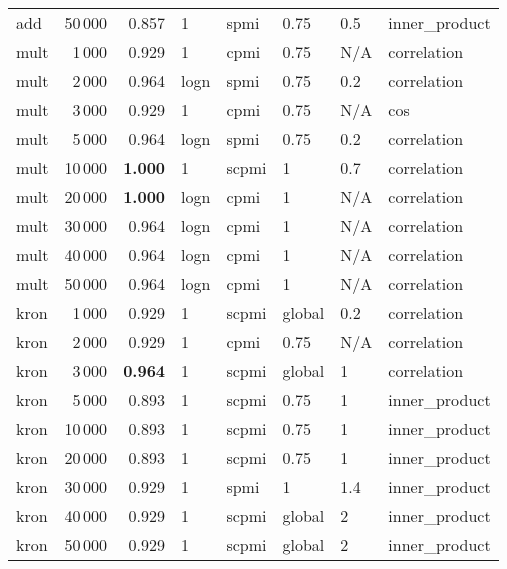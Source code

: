 \begin{tabular}{lrrlllll}
     add &           50\,000 &      0.857 &     1 &   spmi &    0.75 &  0.5 &  inner\_product \\ \addlinespace
    mult &            1\,000 &      0.929 &     1 &   cpmi &    0.75 &  N/A &    correlation \\
    mult &            2\,000 &      0.964 &  logn &   spmi &    0.75 &  0.2 &    correlation \\
    mult &            3\,000 &      0.929 &     1 &   cpmi &    0.75 &  N/A &            cos \\
    mult &            5\,000 &      0.964 &  logn &   spmi &    0.75 &  0.2 &    correlation \\
    mult &           10\,000 &      \textbf{1.000} &     1 &  scpmi &       1 &  0.7 &    correlation \\
    mult &           20\,000 &      \textbf{1.000} &  logn &   cpmi &       1 &  N/A &    correlation \\
    mult &           30\,000 &      0.964 &  logn &   cpmi &       1 &  N/A &    correlation \\
    mult &           40\,000 &      0.964 &  logn &   cpmi &       1 &  N/A &    correlation \\
    mult &           50\,000 &      0.964 &  logn &   cpmi &       1 &  N/A &    correlation \\ \addlinespace
    kron &            1\,000 &      0.929 &     1 &  scpmi &  global &  0.2 &    correlation \\
    kron &            2\,000 &      0.929 &     1 &   cpmi &    0.75 &  N/A &    correlation \\
    kron &            3\,000 &      \textbf{0.964} &     1 &  scpmi &  global &    1 &    correlation \\
    kron &            5\,000 &      0.893 &     1 &  scpmi &    0.75 &    1 &  inner\_product \\
    kron &           10\,000 &      0.893 &     1 &  scpmi &    0.75 &    1 &  inner\_product \\
    kron &           20\,000 &      0.893 &     1 &  scpmi &    0.75 &    1 &  inner\_product \\
    kron &           30\,000 &      0.929 &     1 &   spmi &       1 &  1.4 &  inner\_product \\
    kron &           40\,000 &      0.929 &     1 &  scpmi &  global &    2 &  inner\_product \\
    kron &           50\,000 &      0.929 &     1 &  scpmi &  global &    2 &  inner\_product \\
\bottomrule
\end{tabular}
